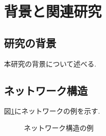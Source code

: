 \section{背景と関連研究}

\subsection{研究の背景}

本研究の背景について述べる.

\subsection{ネットワーク構造}

図\ref{fig:network}にネットワークの例を示す.

\begin{figure}[H]
  \centering
  
  \caption{ネットワーク構造の例}
  \label{fig:network}
\end{figure}

